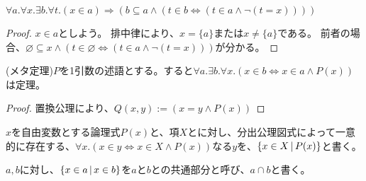 \documentclass[uplatex,papersize,dvipdfmx]{jsarticle}
\begin{document}
    \begin{lemma}
      $\forall a. \forall x. \exists b. \forall t. (x \in a) \Rightarrow (b \subseteq a \land (t \in b \Leftrightarrow (t \in a \land \lnot (t = x))))$
      \begin{proof}
        $x \in a$としよう。
        排中律により、$x = \{a\}$または$x \neq \{a\}$である。
        前者の場合、$\varnothing \subseteq x \land (t \in \varnothing \Leftrightarrow (t \in a \land \lnot (t = x)))$が分かる。
      \end{proof}
    \end{lemma}
    \begin{theorem}
      (メタ定理)$P$を1引数の述語とする。すると$\forall a. \exists b. \forall x. (x \in b \Leftrightarrow x \in a \land P(x))$は定理。
      \begin{proof}
        置換公理により、$Q(x, y) := (x = y \land P(x))$
      \end{proof}
    \end{theorem}
    \begin{definition}[集合の分出記法]
      $x$を自由変数とする論理式$P(x)$と、項$X$とに対し、分出公理図式によって一意的に存在する、$\forall x. (x \in y \Leftrightarrow x \in X \land P(x))$なる$y$を、$\{ x \in X \, | \, P(x) \}$と書く。
    \end{definition}
    \begin{definition}[共通部分]
      $a, b$に対し、$\{ x \in a \, | \, x \in b \}$を$a$と$b$との共通部分と呼び、$a \cap b$と書く。
    \end{definition}
\end{document}
